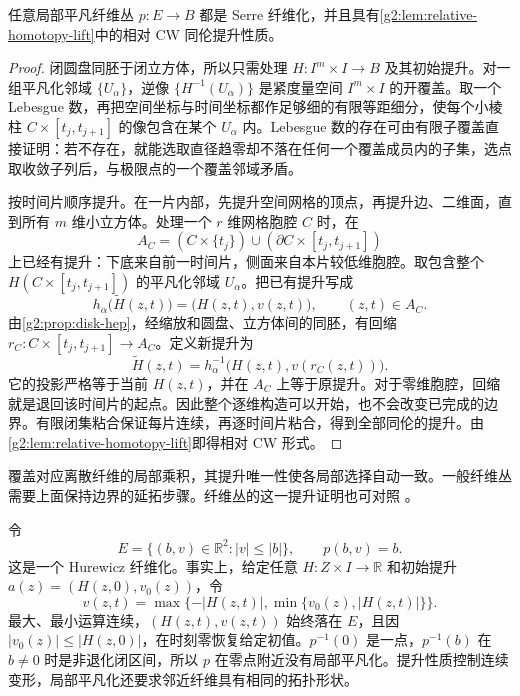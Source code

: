 \begin{theorem}\label{g2:thm:bundle-serre}
	任意局部平凡纤维丛 \(p:E\rightarrow B\) 都是 Serre 纤维化，并且具有\cref{g2:lem:relative-homotopy-lift}中的相对 CW 同伦提升性质。
\end{theorem}
\begin{proof}
	闭圆盘同胚于闭立方体，所以只需处理 \(H:I^m\times I\rightarrow B\) 及其初始提升。对一组平凡化邻域 \(\{U_\alpha\}\)，逆像 \(\{H^{-1}(U_\alpha)\}\) 是紧度量空间 \(I^m\times I\) 的开覆盖。取一个 Lebesgue 数，再把空间坐标与时间坐标都作足够细的有限等距细分，使每个小棱柱 \(C\times[t_j,t_{j+1}]\) 的像包含在某个 \(U_\alpha\) 内。Lebesgue 数的存在可由有限子覆盖直接证明：若不存在，就能选取直径趋零却不落在任何一个覆盖成员内的子集，选点取收敛子列后，与极限点的一个覆盖邻域矛盾。

	按时间片顺序提升。在一片内部，先提升空间网格的顶点，再提升边、二维面，直到所有 \(m\) 维小立方体。处理一个 \(r\) 维网格胞腔 \(C\) 时，在
	\[
		A_C=(C\times\{t_j\})\cup(\partial C\times[t_j,t_{j+1}])
	\]
	上已经有提升：下底来自前一时间片，侧面来自本片较低维胞腔。取包含整个 \(H(C\times[t_j,t_{j+1}])\) 的平凡化邻域 \(U_\alpha\)。把已有提升写成
	\[
		h_\alpha\bigl(\widetilde H(z,t)\bigr)
		=\bigl(H(z,t),v(z,t)\bigr),\qquad (z,t)\in A_C.
	\]
	由\cref{g2:prop:disk-hep}，经缩放和圆盘、立方体间的同胚，有回缩 \(r_C:C\times[t_j,t_{j+1}]\rightarrow A_C\)。定义新提升为
	\[
		\widetilde H(z,t)=h_\alpha^{-1}\bigl(H(z,t),v(r_C(z,t))\bigr).
	\]
	它的投影严格等于当前 \(H(z,t)\)，并在 \(A_C\) 上等于原提升。对于零维胞腔，回缩就是退回该时间片的起点。因此整个逐维构造可以开始，也不会改变已完成的边界。有限闭集粘合保证每片连续，再逐时间片粘合，得到全部同伦的提升。由\cref{g2:lem:relative-homotopy-lift}即得相对 CW 形式。
\end{proof}

覆盖对应离散纤维的局部乘积，其提升唯一性使各局部选择自动一致。一般纤维丛需要上面保持边界的延拓步骤。纤维丛的这一提升证明也可对照 \cite[第4.2节，Fiber Bundles]{Hatcher2002}。

\begin{example}\label{g2:exm:fibration-not-bundle}
	令
	\[
		E=\{(b,v)\in\mathbb R^2:|v|\le|b|\},
		\qquad p(b,v)=b.
	\]
	这是一个 Hurewicz 纤维化。事实上，给定任意 \(H:Z\times I\rightarrow\mathbb R\) 和初始提升 \(a(z)=(H(z,0),v_0(z))\)，令
	\[
		v(z,t)=\max\{-|H(z,t)|,\min\{v_0(z),|H(z,t)|\}\}.
	\]
	最大、最小运算连续，\((H(z,t),v(z,t))\) 始终落在 \(E\)，且因 \(|v_0(z)|\le|H(z,0)|\)，在时刻零恢复给定初值。\(p^{-1}(0)\) 是一点，\(p^{-1}(b)\) 在 \(b\ne0\) 时是非退化闭区间，所以 \(p\) 在零点附近没有局部平凡化。提升性质控制连续变形，局部平凡化还要求邻近纤维具有相同的拓扑形状。
\end{example}

